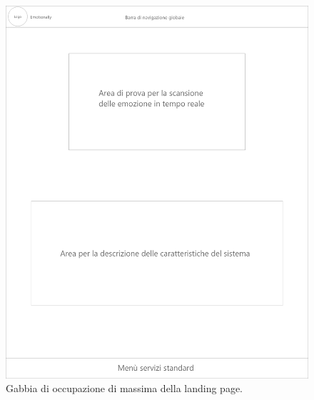 
\begin{figure}[H]
	\centering
	\caption{Gabbia di occupazione di massima della landing page.}
	\label{fig:gabbie-massima:landing-page}
	\includegraphics[width=\textwidth]{images/gabbie-di-massima/Landing}
\end{figure}

